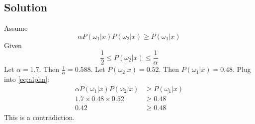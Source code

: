 \documentclass{IEEEtran}
\begin{document}
\subsection{Solution}
Assume
\begin{equation}\label{eq:alpha}
    \alpha P(\omega_1|x)P(\omega_2|x) \ge P(\omega_1|x)
\end{equation}
Given
\begin{equation}
    \frac{1}{2} \le P(\omega_2|x) \le \frac{1}{\alpha}
\end{equation}
Let \(\alpha = 1.7\). Then \(\frac{1}{\alpha} = 0.588\).
Let \(P(\omega_2|x) = 0.52\). Then \(P(\omega_1|x) = 0.48\). Plug into \ref{eq:alpha}:
\begin{align}
    \alpha P(\omega_1|x)P(\omega_2|x) &\ge P(\omega_1|x) \\
    1.7 \times 0.48 \times 0.52 &\ge 0.48 \nonumber      \\
    0.42 &\ge 0.48 \nonumber
\end{align}
This is a contradiction.

\end{document}
